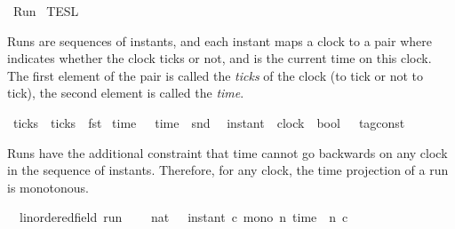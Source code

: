 %
\begin{isabellebody}%
%
%
\isadelimdocument
%
\endisadelimdocument
%
\isatagdocument
%
\isamarkuptrue%
%
\endisatagdocument
{\isafolddocument}%
%
\isadelimdocument
%
\endisadelimdocument
%
\isadelimtheory
%
\endisadelimtheory
%
\isatagtheory
{}\isamarkupfalse%
\ Run\isanewline
{}\ TESL\isanewline
\ \ \ \ \ \ \isanewline
{}%
\endisatagtheory
{\isafoldtheory}%
%
\isadelimtheory
%
\endisadelimtheory
%
\begin{isamarkuptext}%
Runs are sequences of instants, and each instant maps a clock to a pair 
   where  indicates whether the clock ticks or not, 
  and  is the current time on this clock.
  The first element of the pair is called the \emph{ticks} of the clock (to tick or 
  not to tick), the second element is called the \emph{time}.%
\end{isamarkuptext}\isamarkuptrue%
\isamarkupfalse%
\ ticks\ \ {\isacartoucheopen}ticks\ {\isasymequiv}\ fst{\isacartoucheclose}\isanewline
{}\isamarkupfalse%
\ time\ \ \ {\isacartoucheopen}time\ {\isasymequiv}\ snd{\isacartoucheclose}\isanewline
\isanewline
{}\isamarkupfalse%
\ {\isacharprime}{\isasymtau}\ instant\ {\isacharequal}\ {\isacartoucheopen}clock\ {\isasymRightarrow}\ {\isacharparenleft}bool\ {\isasymtimes}\ {\isacharprime}{\isasymtau}\ tag{\isacharunderscore}const{\isacharparenright}{\isacartoucheclose}%
\begin{isamarkuptext}%
Runs have the additional constraint that time cannot go backwards on any clock
  in the sequence of instants.
  Therefore, for any clock, the time projection of a run is monotonous.%
\end{isamarkuptext}\isamarkuptrue%
\isamarkupfalse%
\ {\isacharparenleft}\ {\isacharprime}{\isasymtau}{\isacharcolon}{\isacharcolon}linordered{\isacharunderscore}field\ run\ {\isacharequal}\isanewline
\ \ {\isacartoucheopen}{\isacharbraceleft}\ {\isasymrho}{\isacharcolon}{\isacharcolon}nat\ {\isasymRightarrow}\ {\isacharprime}{\isasymtau}\ instant{\isachardot}\ {\isasymforall}c{\isachardot}\ mono\ {\isacharparenleft}{\isasymlambda}n{\isachardot}\ time\ {\isacharparenleft}{\isasymrho}\ n\ c{\isacharparenright}{\isacharparenright}\ {\isacharbraceright}{\isacartoucheclose}\isanewline

\end{isabellebody}
